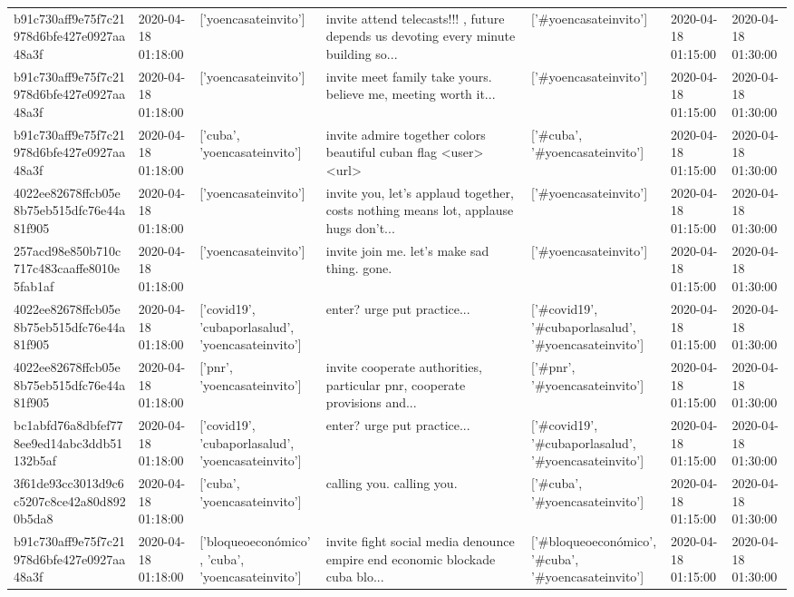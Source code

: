 \begin{tabular}{lllllll}
b91c730aff9e75f7c21978d6bfe427e0927aa48a3f & 2020-04-18 01:18:00 & ['yoencasateinvito'] & invite attend telecasts!!! , future depends us devoting every minute building so... & ['#yoencasateinvito'] & 2020-04-18 01:15:00 & 2020-04-18 01:30:00 \\
b91c730aff9e75f7c21978d6bfe427e0927aa48a3f & 2020-04-18 01:18:00 & ['yoencasateinvito'] & invite meet family take yours. believe me, meeting worth it... & ['#yoencasateinvito'] & 2020-04-18 01:15:00 & 2020-04-18 01:30:00 \\
b91c730aff9e75f7c21978d6bfe427e0927aa48a3f & 2020-04-18 01:18:00 & ['cuba', 'yoencasateinvito'] & invite admire together colors beautiful cuban flag <user> <url> & ['#cuba', '#yoencasateinvito'] & 2020-04-18 01:15:00 & 2020-04-18 01:30:00 \\
4022ee82678ffcb05e8b75eb515dfc76e44a81f905 & 2020-04-18 01:18:00 & ['yoencasateinvito'] & invite you, let's applaud together, costs nothing means lot, applause hugs don't... & ['#yoencasateinvito'] & 2020-04-18 01:15:00 & 2020-04-18 01:30:00 \\
257acd98e850b710c717c483caaffe8010e5fab1af & 2020-04-18 01:18:00 & ['yoencasateinvito'] & invite join me. let's make sad thing. gone. & ['#yoencasateinvito'] & 2020-04-18 01:15:00 & 2020-04-18 01:30:00 \\
4022ee82678ffcb05e8b75eb515dfc76e44a81f905 & 2020-04-18 01:18:00 & ['covid19', 'cubaporlasalud', 'yoencasateinvito'] & enter? urge put practice... & ['#covid19', '#cubaporlasalud', '#yoencasateinvito'] & 2020-04-18 01:15:00 & 2020-04-18 01:30:00 \\
4022ee82678ffcb05e8b75eb515dfc76e44a81f905 & 2020-04-18 01:18:00 & ['pnr', 'yoencasateinvito'] & invite cooperate authorities, particular pnr, cooperate provisions and... & ['#pnr', '#yoencasateinvito'] & 2020-04-18 01:15:00 & 2020-04-18 01:30:00 \\
bc1abfd76a8dbfef778ee9ed14abc3ddb51132b5af & 2020-04-18 01:18:00 & ['covid19', 'cubaporlasalud', 'yoencasateinvito'] & enter? urge put practice... & ['#covid19', '#cubaporlasalud', '#yoencasateinvito'] & 2020-04-18 01:15:00 & 2020-04-18 01:30:00 \\
3f61de93cc3013d9c6c5207c8ce42a80d8920b5da8 & 2020-04-18 01:18:00 & ['cuba', 'yoencasateinvito'] & calling you. calling you. & ['#cuba', '#yoencasateinvito'] & 2020-04-18 01:15:00 & 2020-04-18 01:30:00 \\
b91c730aff9e75f7c21978d6bfe427e0927aa48a3f & 2020-04-18 01:18:00 & ['bloqueoeconómico', 'cuba', 'yoencasateinvito'] & invite fight social media denounce empire end economic blockade cuba blo... & ['#bloqueoeconómico', '#cuba', '#yoencasateinvito'] & 2020-04-18 01:15:00 & 2020-04-18 01:30:00 \\

\end{tabular}
